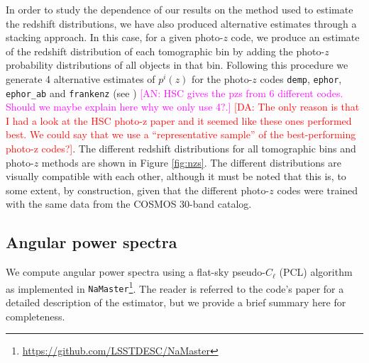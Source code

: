 \documentclass[a4paper,11pt]{article}
\newcommand{\an}[1]{{\textcolor{magenta}{[AN: #1]}}}
\newcommand{\da}[1]{{\textcolor{red}{[DA: #1]}}}
\begin{document}
    In order to study the dependence of our results on the method used to estimate the redshift distributions, we have also produced alternative estimates through a stacking approach. In this case, for a given photo-$z$ code, we produce an estimate of the redshift distribution of each tomographic bin by adding the photo-$z$ probability distributions of all objects in that bin. Following this procedure we generate 4 alternative estimates of $p^i(z)$ for the photo-$z$ codes {\tt demp}, {\tt ephor}, {\tt ephor\_ab} and {\tt frankenz} (see \cite{2018PASJ...70S...9T}) \an{HSC gives the pzs from 6 different codes. Should we maybe explain here why we only use 4?.} \da{The only reason is that I had a look at the HSC photo-z paper and it seemed like these ones performed best. We could say that we use a ``representative sample'' of the best-performing photo-z codes?}. The different redshift distributions for all tomographic bins and photo-$z$ methods are shown in Figure \ref{fig:nzs}. The different distributions are visually compatible with each other, although it must be noted that this is, to some extent, by construction, given that the different photo-$z$ codes were trained with the same data from the COSMOS 30-band catalog.

  \subsection{Angular power spectra}\label{ssec:methods.cell}
    We compute angular power spectra using a flat-sky pseudo-$C_\ell$ (PCL) algorithm \citep{2002ApJ...567....2H} as implemented in {\tt NaMaster}\footnote{\url{https://github.com/LSSTDESC/NaMaster}}. The reader is referred to the code's paper \cite{2019MNRAS.484.4127A} for a detailed description of the estimator, but we provide a brief summary here for completeness.
    
\end{document}
